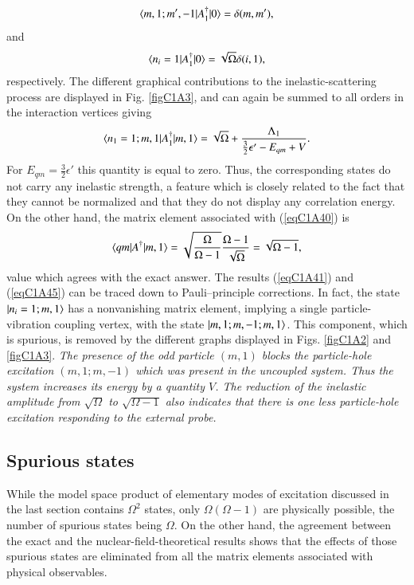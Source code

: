  \begin{align}\label{eqC1A42} 
\langle {m,1;m',-1|A_1^\dagger|0} \rangle=\delta(m,m'),
 \end{align}
and
 \begin{align}\label{eqC1A43} 
\langle {n_i=1|A_1^\dagger|0} \rangle=\sqrt{\Omega}\delta(i,1),
 \end{align}
respectively. The different graphical contributions to the inelastic-scattering
process are displayed in Fig. \ref{figC1A3}, and can again be summed to all orders in the
interaction vertices giving
 \begin{align}\label{eqC1A44} 
\langle {n_1=1;m,1|A_1^\dagger|m,1} \rangle=\sqrt{\Omega}+\frac{\Lambda_1}{\frac{3}{2}\epsilon'-E_{qm}+V}.
 \end{align}
For $E_{qm}=\frac{3}{2}\epsilon'$ this quantity is equal to zero. Thus, the corresponding states
do not carry any inelastic strength, a feature which is closely related to the
fact that they cannot be normalized and that they do not display any correlation energy.
On the other hand, the matrix element associated with (\ref{eqC1A40}) is
 \begin{align}\label{eqC1A45} 
\langle {qm|A^\dagger|m,1} \rangle=\sqrt{\frac{\Omega}{\Omega-1}}\frac{\Omega-1}{\sqrt{\Omega}}=\sqrt{\Omega-1},
 \end{align}
value which agrees with the exact answer.
The results (\ref{eqC1A41}) and (\ref{eqC1A45}) can be traced down to Pauli--principle corrections. In fact, the state $|{n_i=1;m,1} \rangle$ has a nonvanishing matrix element,
implying a single particle-vibration coupling vertex, with the state $|{m,1;m,-1;m,1} \rangle$. This component, which is spurious, is removed by the different graphs displayed in Figs. \ref{figC1A2} and \ref{figC1A3}. \textit{The presence of the odd particle
$(m, 1)$ blocks the particle-hole excitation $(m,1; m,- 1)$ which was present in
the uncoupled system. Thus the system increases its energy by a quantity $V$.
The reduction of the inelastic amplitude from $\sqrt{\Omega}$ to $\sqrt{\Omega-1}$  also indicates
that there is one less particle-hole excitation responding to the external probe.}
\subsection{Spurious states}\label{C1S7sS3}
While the model space product of elementary modes of excitation discussed
in the last section contains $\Omega^2$ states, only $\Omega(\Omega-1)$ are physically possible,
the number of spurious states being $\Omega$.  On the other hand, the agreement
between the exact and the nuclear-field-theoretical results shows that the effects of those spurious states are eliminated from all the matrix elements associated with physical observables.


